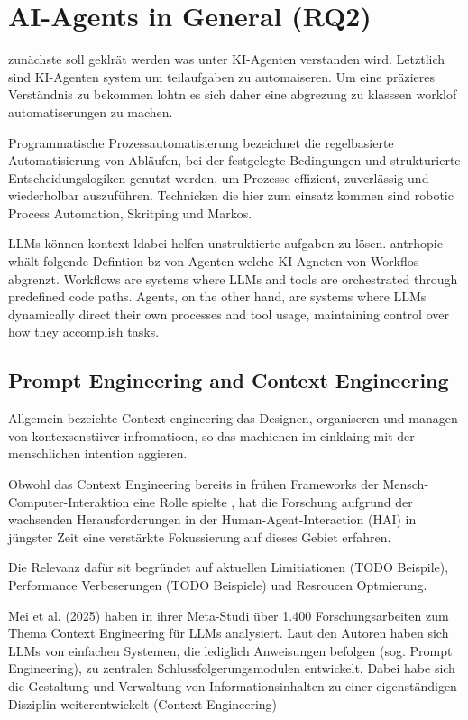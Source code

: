 \section{AI-Agents in General (RQ2)}
\label{sec:ai-agents}
zunächste soll geklrät werden was unter KI-Agenten verstanden wird.
Letztlich sind KI-Agenten system um teilaufgaben zu automaiseren.
Um eine präzieres Verständnis zu bekommen lohtn es sich daher eine abgrezung zu klasssen worklof
automatiserungen zu machen.

Programmatische Prozessautomatisierung bezeichnet die regelbasierte Automatisierung von Abläufen, bei der
festgelegte Bedingungen und strukturierte Entscheidungslogiken genutzt werden, um Prozesse effizient,
zuverlässig und wiederholbar auszuführen. Technicken die hier zum einsatz kommen sind robotic Process
Automation, Skritping und Markos.

LLMs können kontext ldabei helfen unstruktierte aufgaben zu lösen. antrhopic whält folgende Defintion bz von
Agenten welche KI-Agneten von Workflos abgrenzt.
Workflows are systems where LLMs and tools are orchestrated through predefined code paths.
Agents, on the other hand, are systems where LLMs dynamically direct their own processes and tool usage,
maintaining control over how they accomplish tasks.

\subsection{Prompt Engineering and Context Engineering}
\label{sec:context-engineering}

Allgemein bezeichte Context engineering das Designen, organiseren und managen von kontexsenstiiver infromatioen,
so das machienen im einklaing mit der menschlichen intention aggieren. \cite[p. 3]{huaContextEngineering202025}

Obwohl das Context Engineering bereits in frühen Frameworks der Mensch-Computer-Interaktion eine Rolle
spielte \cite[p. 1]{huaContextEngineering202025}, hat die Forschung aufgrund der wachsenden Herausforderungen in der
Human-Agent-Interaction (HAI) in jüngster Zeit eine verstärkte Fokussierung auf dieses Gebiet erfahren.

Die Relevanz dafür sit begründet auf aktuellen Limitiationen (TODO Beispile), Performance Verbeserungen (TODO
Beispiele) und Resroucen Optmierung.

Mei et al. (2025) haben in ihrer Meta-Studi \cite{meiSurveyContextEngineering2025} über 1.400
Forschungsarbeiten zum Thema Context Engineering für LLMs analysiert.
Laut den Autoren haben sich LLMs von einfachen Systemen, die lediglich Anweisungen
befolgen (sog. Prompt Engineering), zu zentralen Schlussfolgerungsmodulen entwickelt. Dabei habe sich
die Gestaltung und Verwaltung von Informationsinhalten zu einer eigenständigen Disziplin weiterentwickelt
(Context Engineering) \cite{meiSurveyContextEngineering2025}

